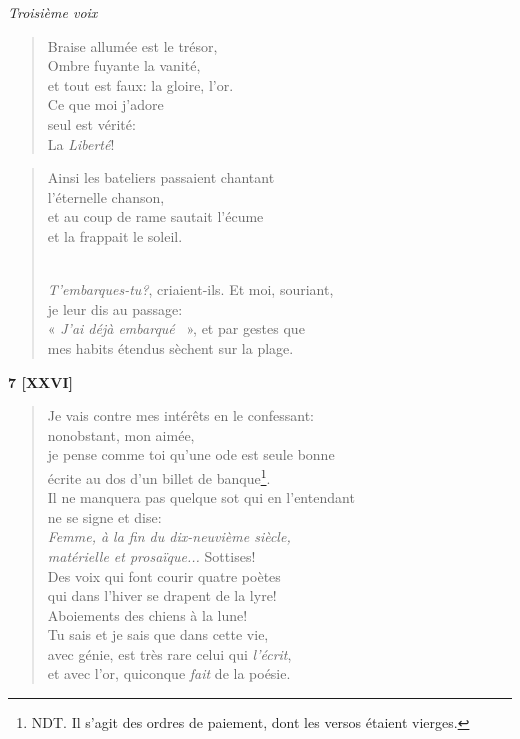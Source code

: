 \documentclass[a4paper,12pt]{book}
\begin{document}
\begin{center} {\em Troisième voix} \end{center}

\begin{verse}
Braise allumée est le trésor, \\
Ombre fuyante la vanité, \\
et tout est faux: la gloire, l'or. \\
Ce que moi j'adore \\
seul est vérité: \\
La {\em Liberté\/}!
\end{verse}

\bigskip

\begin{verse}
Ainsi les bateliers passaient chantant \\
l'éternelle chanson, \\
et au coup de rame sautait l'écume \\
et la frappait le soleil. \\ \

{\em T'embarques-tu?}, criaient-ils. Et moi, souriant, \\
je leur dis au passage: \\
« {\em J'ai déjà embarqué} ~», et par gestes que \\
mes habits étendus sèchent sur la plage. \\
\end{verse}


\begin{center} {\bf 7 [XXVI]} \end{center}

\begin{verse}
Je vais contre mes intérêts en le confessant: \\
nonobstant, mon aimée, \\
je pense comme toi qu'une ode est seule bonne \\
écrite au dos d'un billet de banque\footnote{NDT. Il s'agit des ordres de paiement, dont les versos étaient vierges.}. \\
Il ne manquera pas quelque sot qui en l'entendant \\
ne se signe et dise: \\
{\em Femme, à la fin du dix-neuvième siècle, \\
matérielle et prosaïque...} Sottises! \\
Des voix qui font courir quatre poètes \\
qui dans l'hiver se drapent de la lyre! \\
Aboiements des chiens à la lune! \\
Tu sais et je sais que dans cette vie, \\
avec génie, est très rare celui qui {\em l'écrit}, \\
et avec l'or, quiconque {\em fait} de la poésie. \\
\end{verse}
\end{document}
